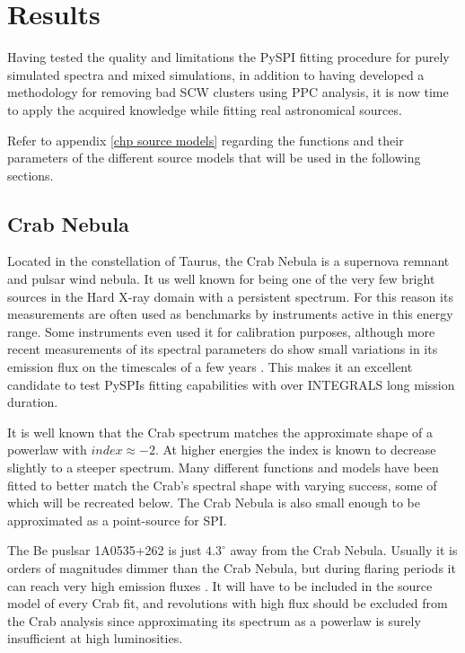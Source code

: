 \documentclass{report}
\begin{document}
\chapter{Results}

Having tested the quality and limitations the PySPI fitting procedure for purely simulated spectra and mixed simulations, in addition to having developed a methodology for removing bad SCW clusters using PPC analysis, it is now time to apply the acquired knowledge while fitting real astronomical sources.

Refer to appendix \ref{chp source models} regarding the functions and their parameters of the different source models that will be used in the following sections.

\section{Crab Nebula}
Located in the constellation of Taurus, the Crab Nebula is a supernova remnant and pulsar wind nebula. It us well known for being one of the very few bright sources in the Hard X-ray domain with a persistent spectrum. For this reason its measurements are often used as benchmarks by instruments active in this energy range. Some instruments even used it for calibration purposes, although more recent measurements of its spectral parameters do show small variations in its emission flux on the timescales of a few years \cite{2020ApJ...899..131J}. This makes it an excellent candidate to test PySPIs fitting capabilities with over INTEGRALS long mission duration. 

It is well known that the Crab spectrum matches the approximate shape of a powerlaw with $index\approx-2$. At higher energies the index is known to decrease slightly to a steeper spectrum. Many different functions and models have been fitted to better match the Crab's spectral shape with varying success, some of which will be recreated below. The Crab Nebula is also small enough to be approximated as a point-source for SPI.

The Be puslsar 1A0535+262 is just $4.3^\circ$ away from the Crab Nebula. Usually it is orders of magnitudes dimmer than the Crab Nebula, but during flaring periods it can reach very high emission fluxes \cite{2020ApJ...899..131J}. It will have to be included in the source model of every Crab fit, and revolutions with high flux should be excluded from the Crab analysis since approximating its spectrum as a powerlaw is surely insufficient at high luminosities. 
\end{document}
